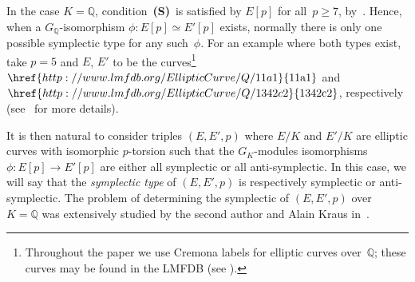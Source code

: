 \documentclass[12pt, reqno]{amsart}
\newcommand{\lmfdbec}[3]{\href{http://www.lmfdb.org/EllipticCurve/Q/#1#2#3}{{\text{\rm#1#2#3}}}}
\newcommand{\Q}{\mathbb{Q}}
\newcommand{\Z}{\mathbb{Z}}
\numberwithin{equation}{section}
\newtheorem{proposition}[theorem]{Proposition}
\theoremstyle{definition}
\theoremstyle{remark}
\newcommand{\condS}{condition~{\bf (S)}}
\begin{document}
In the case $K=\Q$, \condS\ is satisfied by $E[p]$ for
all~$p\ge7$, by~\cite[Corollary~3 and Proposition~2]{FKSym}.  Hence,
when a $G_\Q$-isomorphism $\phi : E[p] \simeq E'[p]$ exists, normally
there is only one possible symplectic type for any such~$\phi$.  For
an example where both types exist, take $p=5$ and $E$, $E'$ to be the
curves\footnote{Throughout the paper we use Cremona labels for
  elliptic curves over~$\Q$; these curves may be found in the LMFDB
  (see \cite{lmfdb}).} $\lmfdbec{11}{a}{1}$ and
$\lmfdbec{1342}{c}{2}$, respectively (see~\cite[Example~5.2]{FKSym}
for more details).

\begin{comment}
\begin{proposition}\label{P:auto}
  Let $E$ and~$E'$ be elliptic curves defined over~$\Q$ such that
  $E[p]\cong E'[p]$ as $G_\Q$-modules.
  \begin{enumerate}
    \item If $E[p]$ is irreducible, then the isomorphism $E[p]\cong
      E'[p]$ is unique up to scaling; hence its symplectic type is
      well-defined.
      \item If $p\ge7$ then the same conclusion also holds when
        $E[p]$ is reducible.
  \end{enumerate}
\end{proposition}
\begin{proof} See~\cite[Corollary~3 and Proposition~2]{FKSym}
\end{proof}
\end{comment}

\begin{comment}
both have $5$-torsion Galois module isomorphic to $\mu_5
\times \Z/5\Z$.  Now let $P,Q \in E[5]$ and $P',Q' \in E'[5]$ be bases
such that $P$, $P'$ are defined over~$\Q$.  The map defined by $P
\mapsto P'$ and $Q \mapsto n\cdot Q'$ (with $5 \nmid n$) is a
$G_\Q$-isomorphism which is symplectic if and only if $n$ is a square
mod~$5$.  Moreover, the automorphism $\alpha$ of $E[5]$ given by
$\alpha(P) = P$ and $\alpha(Q) = 2Q$ is anti-symplectic because $2$ is
not a square modulo~$5$.
\end{comment}

It is then natural to consider triples $(E,E',p)$ where $E/K$ and
$E'/K$ are elliptic curves with isomorphic $p$-torsion such that the
$G_K$-modules isomorphisms $\phi : E[p] \rightarrow E'[p]$ are either
all symplectic or all anti-symplectic.  In this case, we will say that
the {\em symplectic type} of $(E,E',p)$ is respectively symplectic or
anti-symplectic.  The problem of determining the symplectic of
$(E,E',p)$ over~$K=\Q$ was extensively studied by the second author
and Alain Kraus in~\cite{FKSym}.
\end{document}
